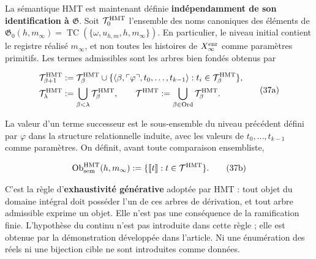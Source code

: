 La sémantique HMT est maintenant définie \textbf{indépendamment de son identification à \(\mathfrak G\)}. Soit \(\mathcal T_0^{\rm HMT}\) l'ensemble des noms canoniques des éléments de \(\mathfrak G_0(h,m_\infty)=
\operatorname{TC}(\{\omega,u_{h,m},h,m_\infty\})\). En particulier, le niveau initial contient le registre réalisé \(m_\infty\), et non toutes les histoires de \(X_\infty^{\rm enr}\) comme paramètres primitifs. Les termes admissibles sont les arbres bien fondés obtenus par

\[
 \begin{aligned}
 \mathcal T^{\rm HMT}_{\beta+1}
 &:={\mathcal T}^{\rm HMT}_\beta\cup
 \{\langle\beta,\ulcorner\varphi\urcorner,
       t_0,\ldots,t_{k-1}\rangle:
       t_i\in\mathcal T^{\rm HMT}_\beta\},\\
 \mathcal T^{\rm HMT}_\lambda&:=
       \bigcup_{\beta<\lambda}\mathcal T^{\rm HMT}_\beta,
 \qquad
 \mathcal T^{\rm HMT}:=
       \bigcup_{\beta\in\operatorname{Ord}}\mathcal T^{\rm HMT}_\beta.
 \end{aligned}
\tag{37a}\label{hmtfg:base:eq:ch-terminos}
\]

La valeur d’un terme successeur est le sous-ensemble du niveau précédent défini
par \(\varphi\) dans la structure relationnelle induite, avec les valeurs de
\(t_0,\ldots,t_{k-1}\) comme paramètres. On définit, avant toute
comparaison ensembliste,

\[
 \operatorname{Ob}_{\rm sem}^{\rm HMT}(h,m_\infty)
 :=\{\llbracket t\rrbracket:t\in\mathcal T^{\rm HMT}\}.
\tag{37b}\label{hmtfg:base:eq:ch-objetos-semanticos}
\]

C'est la règle d'\textbf{exhaustivité générative} adoptée par HMT : tout objet du domaine intégral doit posséder l'un de ces arbres de dérivation, et tout arbre admissible exprime un objet. Elle n'est pas une conséquence de la ramification finie. L'hypothèse du continu n'est pas introduite dans cette règle ; elle est obtenue par la démonstration développée dans l'article. Ni une énumération des réels ni une bijection cible ne sont introduites comme données.

